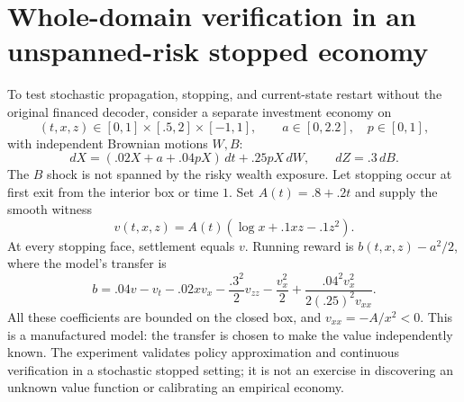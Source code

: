 \section{Whole-domain verification in an unspanned-risk stopped economy}\label{sec:stochastic}
To test stochastic propagation, stopping, and current-state restart without the original financed decoder, consider a separate investment economy on
\[
 (t,x,z)\in[0,1]\times[.5,2]\times[-1,1],\qquad
 a\in[0,2.2],\quad p\in[0,1],
\]
with independent Brownian motions $W,B$:
\begin{equation}
 dX=(.02X+a+.04pX)\,dt+.25pX\,dW,
 \qquad dZ=.3\,dB.\label{eq:reference_dynamics}
\end{equation}
The $B$ shock is not spanned by the risky wealth exposure. Let stopping occur at first exit from the interior box or time $1$. Set $A(t)=.8+.2t$ and supply the smooth witness
\begin{equation}
 v(t,x,z)=A(t)(\log x+.1xz-.1z^2).\label{eq:reference_witness}
\end{equation}
At every stopping face, settlement equals $v$. Running reward is $b(t,x,z)-a^2/2$, where the model's transfer is
\begin{equation}
 b=.04v-v_t-.02xv_x-\frac{.3^2}{2}v_{zz}
 -\frac{v_x^2}{2}+\frac{.04^2v_x^2}{2(.25)^2v_{xx}}.\label{eq:transfer}
\end{equation}
All these coefficients are bounded on the closed box, and $v_{xx}=-A/x^2<0$. This is a manufactured model: the transfer is chosen to make the value independently known. The experiment validates policy approximation and continuous verification in a stochastic stopped setting; it is not an exercise in discovering an unknown value function or calibrating an empirical economy.

